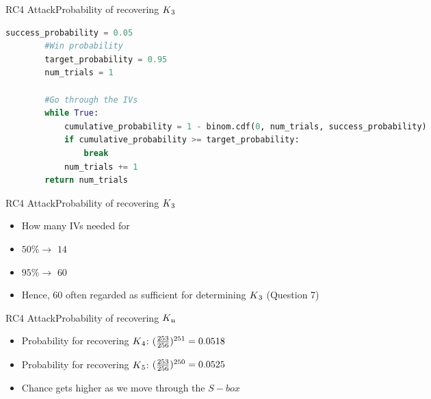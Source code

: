 \documentclass[
	aspectratio=169,	%
	onlytextwidth,		%
	t,					%
	]{beamer}
\begin{document}
\begin{frame}[fragile]{RC4 Attack}{Probability of recovering $K\textsubscript{3}$}
	\begin{lstlisting}[language=Python]
		success_probability = 0.05
		#Win probability
		target_probability = 0.95
		num_trials = 1

		#Go through the IVs
		while True:
			cumulative_probability = 1 - binom.cdf(0, num_trials, success_probability)
			if cumulative_probability >= target_probability:
				break
			num_trials += 1
		return num_trials
	\end{lstlisting}
\end{frame}

\begin{frame}[fragile]{RC4 Attack}{Probability of recovering $K\textsubscript{3}$}
	\begin{itemize}
		\item How many IVs needed for 
		\item $50\% \rightarrow$ $14$
		\item $95\% \rightarrow$ $60$
		\item Hence, $60$ often regarded as sufficient for determining $K\textsubscript{3}$ (Question 7)
	\end{itemize}
\end{frame}

\begin{frame}[fragile]{RC4 Attack}{Probability of recovering $K\textsubscript{n}$}
	\begin{itemize}
		\item Probability for recovering $K\textsubscript{4}$: $(\frac{253}{256})\textsuperscript{251} = 0.0518$
		\item Probability for recovering $K\textsubscript{5}$: $(\frac{253}{256})\textsuperscript{250} = 0.0525$
		\item Chance gets higher as we move through the $S-box$
	\end{itemize}
\end{frame}
\end{document}
